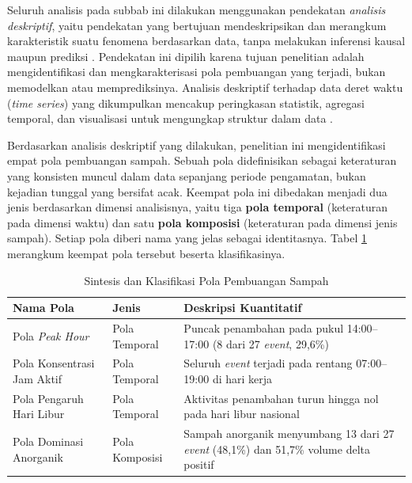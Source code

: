 Seluruh analisis pada subbab ini dilakukan menggunakan pendekatan \textit{analisis deskriptif}, yaitu pendekatan yang bertujuan mendeskripsikan dan merangkum karakteristik suatu fenomena berdasarkan data, tanpa melakukan inferensi kausal maupun prediksi \autocite{loeb2017descriptive}. Pendekatan ini dipilih karena tujuan penelitian adalah mengidentifikasi dan mengkarakterisasi pola pembuangan yang terjadi, bukan memodelkan atau memprediksinya. Analisis deskriptif terhadap data deret waktu (\textit{time series}) yang dikumpulkan mencakup peringkasan statistik, agregasi temporal, dan visualisasi untuk mengungkap struktur dalam data \autocite{wickham2016r}.

Berdasarkan analisis deskriptif yang dilakukan, penelitian ini mengidentifikasi empat pola pembuangan sampah. Sebuah pola didefinisikan sebagai keteraturan yang konsisten muncul dalam data sepanjang periode pengamatan, bukan kejadian tunggal yang bersifat acak. Keempat pola ini dibedakan menjadi dua jenis berdasarkan dimensi analisisnya, yaitu tiga \textbf{pola temporal} (keteraturan pada dimensi waktu) dan satu \textbf{pola komposisi} (keteraturan pada dimensi jenis sampah). Setiap pola diberi nama yang jelas sebagai identitasnya. Tabel \ref{tab:sintesis-temuan} merangkum keempat pola tersebut beserta klasifikasinya.

\begin{table}[H]
  \caption{Sintesis dan Klasifikasi Pola Pembuangan Sampah}
  \label{tab:sintesis-temuan}
  \begin{tabularx}{\textwidth}{| l | l | X |}
    \hline
    \textbf{Nama Pola} & \textbf{Jenis} & \textbf{Deskripsi Kuantitatif} \\
    \hline
    Pola \textit{Peak Hour} & Pola Temporal & Puncak penambahan pada pukul 14:00--17:00 (8 dari 27 \textit{event}, 29,6\%) \\
    \hline
    Pola Konsentrasi Jam Aktif & Pola Temporal & Seluruh \textit{event} terjadi pada rentang 07:00--19:00 di hari kerja \\
    \hline
    Pola Pengaruh Hari Libur & Pola Temporal & Aktivitas penambahan turun hingga nol pada hari libur nasional \\
    \hline
    Pola Dominasi Anorganik & Pola Komposisi & Sampah anorganik menyumbang 13 dari 27 \textit{event} (48,1\%) dan 51,7\% volume delta positif \\
    \hline
  \end{tabularx}
\end{table}

